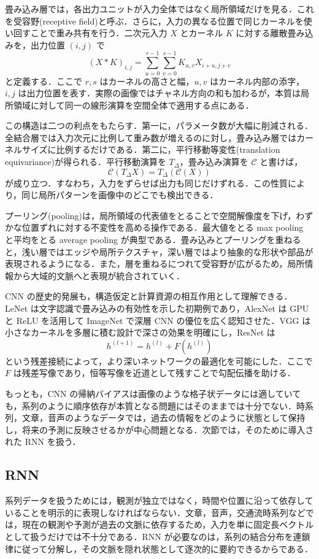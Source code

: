 畳み込み層では，各出力ユニットが入力全体ではなく局所領域だけを見る．これを受容野(receptive field)と呼ぶ．さらに，入力の異なる位置で同じカーネルを使い回すことで重み共有を行う．二次元入力 $X$ とカーネル $K$ に対する離散畳み込みを，出力位置 $(i,j)$ で
\[
(X*K)_{i,j}
= \sum_{u=0}^{r-1}\sum_{v=0}^{s-1} K_{u,v}X_{i+u,j+v}
\]
と定義する．ここで $r,s$ はカーネルの高さと幅，$u,v$ はカーネル内部の添字，$i,j$ は出力位置を表す．実際の画像ではチャネル方向の和も加わるが，本質は局所領域に対して同一の線形演算を空間全体で適用する点にある．

この構造は二つの利点をもたらす．第一に，パラメータ数が大幅に削減される．全結合層では入力次元に比例して重み数が増えるのに対し，畳み込み層ではカーネルサイズに比例するだけである．第二に，平行移動等変性(translation equivariance)が得られる．平行移動演算を $T_\Delta$，畳み込み演算を $\mathcal C$ と書けば，
\[
\mathcal C(T_\Delta X)= T_\Delta(\mathcal C(X))
\]
が成り立つ．すなわち，入力をずらせば出力も同じだけずれる．この性質により，同じ局所パターンを画像中のどこでも検出できる．

プーリング(pooling)は，局所領域の代表値をとることで空間解像度を下げ，わずかな位置ずれに対する不変性を高める操作である．最大値をとる max pooling と平均をとる average pooling が典型である．畳み込みとプーリングを重ねると，浅い層ではエッジや局所テクスチャ，深い層ではより抽象的な形状や部品が表現されるようになる．また，層を重ねるにつれて受容野が広がるため，局所情報から大域的文脈へと表現が統合されていく．

CNN の歴史的発展も，構造仮定と計算資源の相互作用として理解できる．LeNet は文字認識で畳み込みの有効性を示した初期例であり，AlexNet は GPU と ReLU を活用して ImageNet で深層 CNN の優位を広く認知させた．VGG は小さなカーネルを多層に積む設計で深さの効果を明確にし，ResNet は
\[
h^{(l+1)} = h^{(l)} + F(h^{(l)})
\]
という残差接続によって，より深いネットワークの最適化を可能にした．ここで $F$ は残差写像であり，恒等写像を近道として残すことで勾配伝播を助ける．

もっとも，CNN の帰納バイアスは画像のような格子状データには適していても，系列のように順序依存が本質となる問題にはそのままでは十分でない．時系列，文章，音声のようなデータでは，過去の情報をどのように状態として保持し，将来の予測に反映させるかが中心問題となる．次節では，そのために導入された RNN を扱う．

\subsection{RNN}
系列データを扱うためには，観測が独立ではなく，時間や位置に沿って依存していることを明示的に表現しなければならない．文章，音声，交通流時系列などでは，現在の観測や予測が過去の文脈に依存するため，入力を単に固定長ベクトルとして扱うだけでは不十分である．RNN が必要なのは，系列の結合分布を連鎖律に従って分解し，その文脈を隠れ状態として逐次的に要約できるからである．

